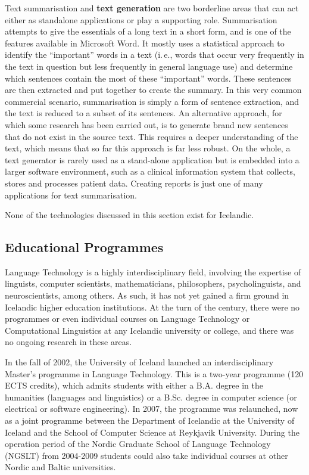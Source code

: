 \documentclass{../../metanetpaper}
\begin{document}
\begin{multicols}{2}
Text summarisation and \textbf{text generation} are two borderline areas that can act either as standalone applications or play a supporting role. Summarisation attempts to give the essentials of a long text in a short form, and is one of the features available in Microsoft Word. It mostly uses a statistical approach to identify the “important” words in a text (i.\,e., words that occur very frequently in the text in question but less frequently in general language use) and determine which sentences contain the most of these “important” words. These sentences are then extracted and put together to create the summary. In this very common commercial scenario, summarisation is simply a form of sentence extraction, and the text is reduced to a subset of its sentences. An alternative approach, for which some research has been carried out, is to generate brand new sentences that do not exist in the source text. 
This requires a deeper understanding of the text, which means that so far this approach is far less robust. On the whole, a text generator is rarely used as a stand-alone application but is embedded into a larger software environment, such as a clinical information system that collects, stores and processes patient data. Creating reports is just one of many applications for text summarisation.

None of the technologies discussed in this section exist for Icelandic.

\subsection{Educational Programmes}

Language Technology is a highly interdisciplinary field, involving the expertise of linguists, computer scientists, mathematicians, philosophers, psycholinguists, and neuroscientists, among others. As such, it has not yet gained a firm ground in Icelandic higher education institutions. At the turn of the century, there were no programmes or even individual courses on Language Technology or Computational Linguistics at any Icelandic university or college, and there was no ongoing research in these areas.

In the fall of 2002, the University of Iceland launched an interdisciplinary Master’s programme in Language Technology. This is a two-year programme (120 ECTS credits), which admits students with either a B.A. degree in the humanities (languages and linguistics) or a B.Sc. degree in computer science (or electrical or software engineering). In 2007, the programme was relaunched, now as a joint programme between the Department of Icelandic at the University of Iceland and the School of Computer Science at Reykjavik University. During the operation period of the Nordic Graduate School of Language Technology (NGSLT) from 2004-2009 students could also take individual courses at other Nordic and Baltic universities.


\end{multicols}
\end{document}
